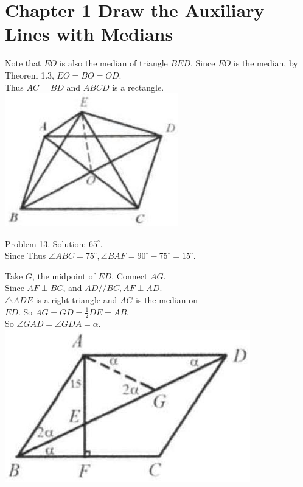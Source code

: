 \documentclass[10pt]{article}
\begin{document}
\section*{Chapter 1 Draw the Auxiliary Lines with Medians}
Note that \(E O\) is also the median of triangle \(B E D\). Since \(E O\) is the median, by Theorem 1.3, \(E O=B O=O D\).\\
Thus \(A C=B D\) and \(A B C D\) is a rectangle.\\
\includegraphics[max width=\textwidth, center]{2025_04_17_97bc1f7e44d93c271a88g-022}

Problem 13. Solution: \(65^{\circ}\).\\
Since Thus \(\angle A B C=75^{\circ}, \angle B A F=90^{\circ}-75^{\circ}=15^{\circ}\).

Take \(G\), the midpoint of \(E D\). Connect \(A G\).\\
Since \(A F \perp B C\), and \(A D / / B C, A F \perp A D\).\\
\(\triangle A D E\) is a right triangle and \(A G\) is the median on\\
\(E D\). So \(A G=G D=\frac{1}{2} D E=A B\).\\
So \(\angle G A D=\angle G D A=\alpha\).\\
\includegraphics[max width=\textwidth, center]{2025_04_17_97bc1f7e44d93c271a88g-022(1)}
\end{document}
